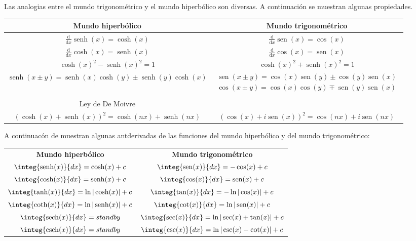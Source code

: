 \documentclass[pts12]{article}
\numberwithin{equation}{section}
\DeclareMathOperator{\sech}{sech}
\DeclareMathOperator{\sen}{sen}
\DeclareMathOperator{\senh}{senh}
\DeclareMathOperator{\csch}{csch}
\newcommand{\der}[1]{\frac{\mathrm{d}}{\mathrm{d}#1}}
\begin{document}

Las analogias entre el mundo trigonométrico y el mundo hiperbólico son diversas. A continuación se muestran algunas propiedades.

\hspace{1cm}

\begin{center}
{\tabulinesep=1.2mm
\begin{tabu} {|c|c|}
    \hline
    \textbf{Mundo hiperbólico} &  \textbf{Mundo trigonométrico} \\ 
    \hline
    $\der{x}\senh(x)=\cosh(x)$ & $\der{x}\sen(x)=\cos(x)$ \\
    \hline
    $\der{x}\cosh(x)=\senh(x)$ & $\der{x}\cos(x)=\sen(x)$ \\ [0.5ex]
    \hline
    $\cosh(x)^2-\senh(x)^2=1$ & $\cosh(x)^2+\senh(x)^2=1$ \\
    \hline
$\senh(x\pm y)=\senh(x)\cosh(y)\pm \senh(y)\cosh(x)$ & $\begin{array}{c}
    \sen(x\pm y)=\cos(x)\sen(y)\pm \cos(y)\sen(x) \\ 
    \cos(x\pm y)=\cos(x)\cos(y)\mp \sen(y)\sen(x) \\
\end{array}$ \\
    \hline
    Ley de De Moivre & \\
    $\left(\cosh(x)+\senh(x)\right)^2=\cosh(nx)+\senh(nx)$ & $\left(\cos(x)+i\sen(x)\right)^2=\cos(nx)+i\sen(nx)$ \\
    \hline
\end{tabu}}
\end{center}


\hspace{1cm}

A continuacón de muestran algunas antderivadas de las funciones del mundo hiperbólico y del mundo trigonométrico:

\hspace{1cm}

\begin{center}
{\tabulinesep=1.2mm
\begin{tabu} {|c|c|}
    \hline
    \textbf{Mundo hiperbólico} &  \textbf{Mundo trigonométrico} \\
    $\integ{\senh(x)}{dx}=\cosh(x)+c$ & $\integ{\sen(x)}{dx}=-\cos(x)+c$ \\
    \hline
    $\integ{\cosh(x)}{dx}=\senh(x)+c$ & $\integ{\cos(x)}{dx}=\sen(x)+c$ \\
    \hline
    $\integ{\tanh(x)}{dx}=\ln|\cosh(x)|+c$ & $\integ{\tan(x)}{dx}=-\ln|\cos(x)|+c$ \\
    \hline
    $\integ{\coth(x)}{dx}=\ln|\senh(x)|+c$ & $\integ{\cot(x)}{dx}=\ln|\sen(x)|+c$ \\
    \hline
    $\integ{\sech(x)}{dx}=standby$ & $\integ{\sec(x)}{dx}=\ln|\sec(x)+\tan(x)|+c$ \\
    \hline
    $\integ{\csch(x)}{dx}=standby$ & $\integ{\csc(x)}{dx}=\ln|\csc(x)-\cot(x)|+c$ \\
    \hline
\end{tabu}}
\end{center}
\end{document}
